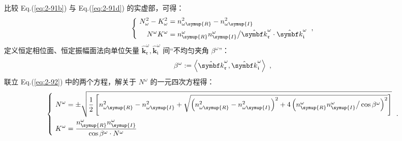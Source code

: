 比较 Eq.(\ref{eq:2-91b}) 与 Eq.(\ref{eq:2-91d}) 的实虚部，可得：
\begin{equation} \label{eq:2-92}
	\abovedisplayskip=12pt
	\belowdisplayskip=12pt
	\left\{\ \begin{aligned} N^{2}_{\omega} - K^{2}_{\omega} &= n^{2}_{\omega \symup{R}} - n^{2}_{\omega \symup{I}} \\ N^\omega K^\omega &= n^\omega_{\symup{R}} n^\omega_{\symup{I}} \big/ \hat{\symbf k}_{\mathfrak{r}}^\omega \cdot \hat{\symbf k}_{\mathfrak{i}}^\omega \end{aligned}\right. ~,
\end{equation}
定义恒定相位面、恒定振幅面法向单位矢量 $\hat{\symbf k}_{\mathfrak{r}}^\omega, \hat{\symbf k}_{\mathfrak{i}}^\omega$ 间“不均匀夹角 $\beta^\omega$”：
\begin{equation} \label{eq:2-93}
	\abovedisplayskip=16pt
	\belowdisplayskip=16pt
	\beta^\omega := \left< \hat{\symbf k}_{\mathfrak{r}}^\omega, \hat{\symbf k}_{\mathfrak{i}}^\omega \right> ~,
\end{equation}
联立 Eq.(\ref{eq:2-92}) 中的两个方程，解关于 $N^\omega$ 的一元四次方程得\cite{changRayTracingAbsorbing2005}：
\begin{equation} \label{eq:2-94}
	\abovedisplayskip=20pt
	\belowdisplayskip=12pt
	\left\{\ \begin{aligned} N^{\omega} &= \pm \sqrt{ \frac{ 1 }{ 2 } \left[ n^{2}_{\omega \symup{R}} - n^{2}_{\omega \symup{I}} + \sqrt{ \left( n^{2}_{\omega \symup{R}} - n^{2}_{\omega \symup{I}} \right)^2 + 4 \left( n^\omega_{\symup{R}} n^\omega_{\symup{I}} \big/ \cos \beta^\omega \right)^2 } \right] } \\ K^\omega &= \frac{ n^\omega_{\symup{R}} n^\omega_{\symup{I}} }{ \cos \beta^\omega \cdot N^\omega } \end{aligned}\right. ~.
\end{equation}

